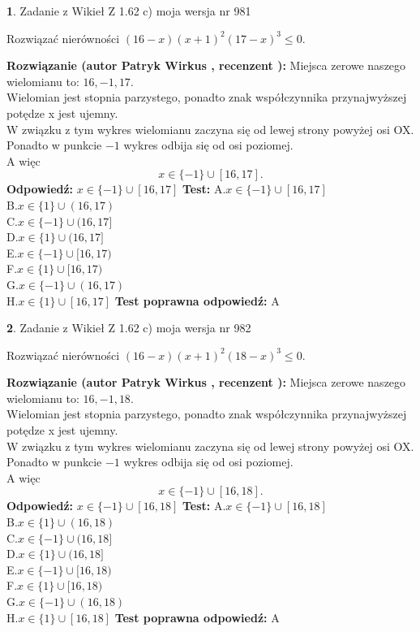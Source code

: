 \documentclass[12pt, a4paper]{article}
\theoremstyle{definition} %
\newtheorem{zad}{}
\newcommand{\zadStart}[1]{\begin{zad}#1\newline}
\newcommand{\zadStop}{\end{zad}}
\newcommand{\rozwStart}[2]{\noindent \textbf{Rozwiązanie (autor #1 , recenzent #2): }\newline}
\newcommand{\rozwStop}{\newline}
\newcommand{\odpStart}{\noindent \textbf{Odpowiedź:}\newline}
\newcommand{\odpStop}{\newline}
\newcommand{\testStart}{\noindent \textbf{Test:}\newline}
\newcommand{\testStop}{\newline}
\newcommand{\kluczStart}{\noindent \textbf{Test poprawna odpowiedź:}\newline}
\newcommand{\kluczStop}{\newline}
\begin{document}
\zadStart{Zadanie z Wikieł Z 1.62 c) moja wersja nr 981}

Rozwiązać nierówności $(16-x)(x+1)^{2}(17-x)^{3}\le0$.
\zadStop
\rozwStart{Patryk Wirkus}{}
Miejsca zerowe naszego wielomianu to: $16, -1, 17$.\\
Wielomian jest stopnia parzystego, ponadto znak współczynnika przy\linebreak najwyższej potędze x jest ujemny.\\ W związku z tym wykres wielomianu zaczyna się od lewej strony powyżej osi OX.\\
Ponadto w punkcie $-1$ wykres odbija się od osi poziomej.\\
A więc $$x \in \{-1\} \cup [16,17].$$
\rozwStop
\odpStart
$x \in \{-1\} \cup [16,17]$
\odpStop
\testStart
A.$x \in \{-1\} \cup [16,17]$\\
B.$x \in \{1\} \cup (16,17)$\\
C.$x \in \{-1\} \cup (16,17]$\\
D.$x \in \{1\} \cup (16,17]$\\
E.$x \in \{-1\} \cup [16,17)$\\
F.$x \in \{1\} \cup [16,17)$\\
G.$x \in \{-1\} \cup (16,17)$\\
H.$x \in \{1\} \cup [16,17]$
\testStop
\kluczStart
A
\kluczStop



\zadStart{Zadanie z Wikieł Z 1.62 c) moja wersja nr 982}

Rozwiązać nierówności $(16-x)(x+1)^{2}(18-x)^{3}\le0$.
\zadStop
\rozwStart{Patryk Wirkus}{}
Miejsca zerowe naszego wielomianu to: $16, -1, 18$.\\
Wielomian jest stopnia parzystego, ponadto znak współczynnika przy\linebreak najwyższej potędze x jest ujemny.\\ W związku z tym wykres wielomianu zaczyna się od lewej strony powyżej osi OX.\\
Ponadto w punkcie $-1$ wykres odbija się od osi poziomej.\\
A więc $$x \in \{-1\} \cup [16,18].$$
\rozwStop
\odpStart
$x \in \{-1\} \cup [16,18]$
\odpStop
\testStart
A.$x \in \{-1\} \cup [16,18]$\\
B.$x \in \{1\} \cup (16,18)$\\
C.$x \in \{-1\} \cup (16,18]$\\
D.$x \in \{1\} \cup (16,18]$\\
E.$x \in \{-1\} \cup [16,18)$\\
F.$x \in \{1\} \cup [16,18)$\\
G.$x \in \{-1\} \cup (16,18)$\\
H.$x \in \{1\} \cup [16,18]$
\testStop
\kluczStart
A
\kluczStop
\end{document}
